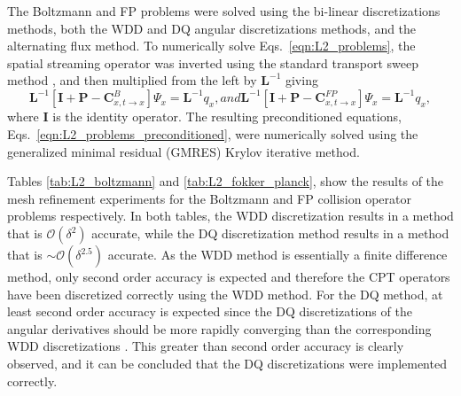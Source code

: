 \documentclass[../main.tex]{subfiles}
\begin{document}
The Boltzmann and FP problems were solved using the bi-linear \dG discretizations methods, both the WDD and DQ angular discretizations methods, and the alternating flux method. To numerically solve Eqs.~\eqref{eqn:L2_problems}, the spatial streaming operator was inverted using the standard transport sweep method \cite{Lewis-1984}, and then multiplied from the left by $\boldsymbol{L}^{-1}$ giving
\begin{subequations} \label{eqn:L2_problems_preconditioned}
  \begin{equation} 
    \boldsymbol{L}^{-1} \left[ \boldsymbol{I} + \boldsymbol{P} - \boldsymbol{C}^B_{x,t\rightarrow x} \right] \Psi_x = \boldsymbol{L}^{-1} q_x,
  \end{equation}
  and
  \begin{equation}
    \boldsymbol{L}^{-1} \left[ \boldsymbol{I} + \boldsymbol{P} - \boldsymbol{C}^{FP}_{x,t\rightarrow x} \right] \Psi_x = \boldsymbol{L}^{-1} q_x,
  \end{equation}
\end{subequations}
where $\boldsymbol{I}$ is the identity operator. The resulting preconditioned equations, Eqs.~\eqref{eqn:L2_problems_preconditioned}, were numerically solved using the generalized minimal residual (GMRES) Krylov iterative method. 

Tables \ref{tab:L2_boltzmann} and \ref{tab:L2_fokker_planck}, show the results of the mesh refinement experiments for the Boltzmann and FP collision operator problems respectively. In both tables, the WDD discretization results in a method that is $\mathcal{O}(\delta^{2})$ accurate, while the DQ discretization method results in a method that is $\sim\mathcal{O}(\delta^{2.5})$ accurate. As the WDD method is essentially a finite difference method, only second order accuracy is expected and therefore the CPT operators have been discretized correctly using the WDD method. For the DQ method, at least second order accuracy is expected since the DQ discretizations of the angular derivatives should be more rapidly converging than the corresponding WDD discretizations \cite{Warsa-2012} \cite{Warsa-2014}. This greater than second order accuracy is clearly observed, and it can be concluded that the DQ discretizations were implemented correctly.
\end{document}
